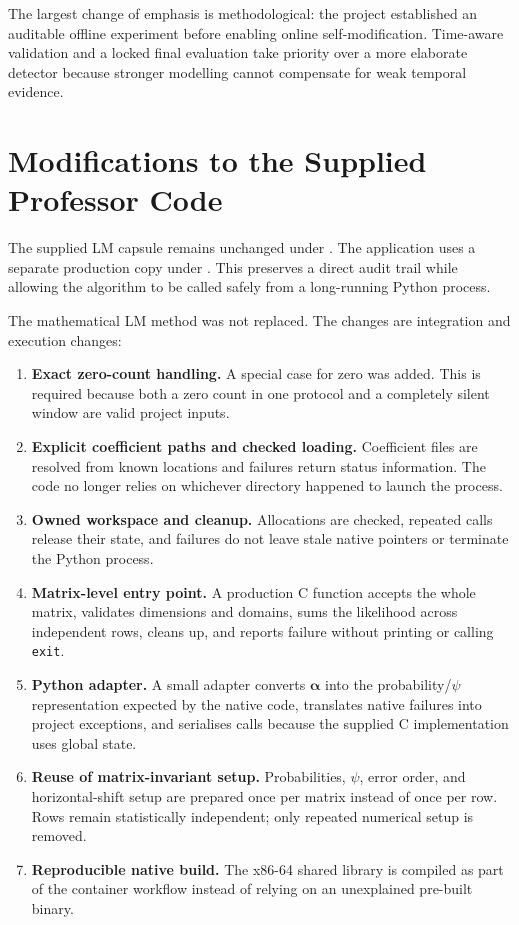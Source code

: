 \documentclass[11pt,a4paper]{article}
\begin{document}
The largest change of emphasis is methodological: the project established an auditable offline experiment before enabling online self-modification. Time-aware validation and a locked final evaluation take priority over a more elaborate detector because stronger modelling cannot compensate for weak temporal evidence.

\section{Modifications to the Supplied Professor Code}
\label{sec:lm-modifications}

The supplied LM capsule remains unchanged under . The application uses a separate production copy under . This preserves a direct audit trail while allowing the algorithm to be called safely from a long-running Python process.

The mathematical LM method was not replaced. The changes are integration and execution changes:

\begin{enumerate}
  \item \textbf{Exact zero-count handling.} A special case for zero was added. This is required because both a zero count in one protocol and a completely silent window are valid project inputs.
  \item \textbf{Explicit coefficient paths and checked loading.} Coefficient files are resolved from known locations and failures return status information. The code no longer relies on whichever directory happened to launch the process.
  \item \textbf{Owned workspace and cleanup.} Allocations are checked, repeated calls release their state, and failures do not leave stale native pointers or terminate the Python process.
  \item \textbf{Matrix-level entry point.} A production C function accepts the whole matrix, validates dimensions and domains, sums the likelihood across independent rows, cleans up, and reports failure without printing or calling \texttt{exit}.
  \item \textbf{Python adapter.} A small adapter converts $\boldsymbol{\alpha}$ into the probability/$\psi$ representation expected by the native code, translates native failures into project exceptions, and serialises calls because the supplied C implementation uses global state.
  \item \textbf{Reuse of matrix-invariant setup.} Probabilities, $\psi$, error order, and horizontal-shift setup are prepared once per matrix instead of once per row. Rows remain statistically independent; only repeated numerical setup is removed.
  \item \textbf{Reproducible native build.} The x86-64 shared library is compiled as part of the container workflow instead of relying on an unexplained pre-built binary.
\end{enumerate}
\end{document}
